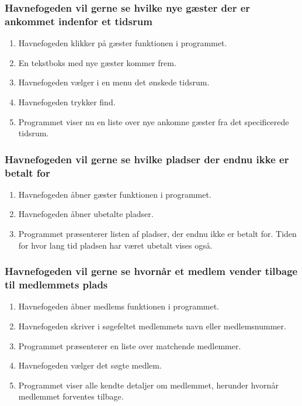     \subsubsection{Havnefogeden vil gerne se hvilke nye gæster der er ankommet indenfor et tidsrum}
    \begin{enumerate}
      \item Havnefogeden klikker på gæster funktionen i programmet.
      \item En tekstboks med nye gæster kommer frem.
      \item Havnefogeden vælger i en menu det ønskede tidsrum.
      \item Havnefogeden trykker find.
      \item Programmet viser nu en liste over nye ankomne gæster fra det specificerede tidsrum.
    \end{enumerate}

    \subsubsection{Havnefogeden vil gerne se hvilke pladser der endnu ikke er betalt for}
    \begin{enumerate}
      \item Havnefogeden åbner gæster funktionen i programmet.
      \item Havnefogeden åbner ubetalte pladser.
      \item Programmet præsenterer listen af pladser, der endnu ikke er betalt for. Tiden for hvor lang tid pladsen har været ubetalt vises også.
    \end{enumerate}

    \subsubsection{Havnefogeden vil gerne se hvornår et medlem vender tilbage til medlemmets plads}
    \begin{enumerate}
      \item Havnefogeden åbner medlems funktionen i programmet.
      \item Havnefogeden skriver i søgefeltet medlemmets navn eller medlemsnummer.
      \item Programmet præsenterer en liste over matchende medlemmer.
      \item Havnefogeden vælger det søgte medlem.
      \item Programmet viser alle kendte detaljer om medlemmet, herunder hvornår medlemmet forventes tilbage.
    \end{enumerate}

